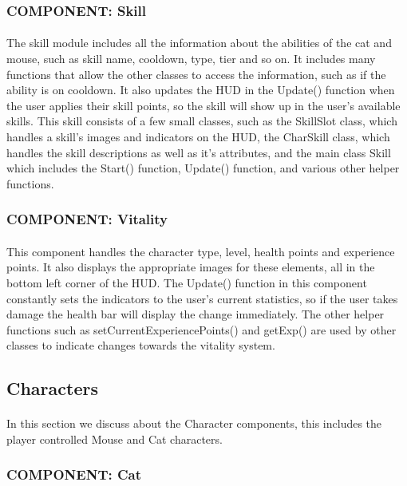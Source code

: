\documentclass[12pt, titlepage]{article}
\begin{document}
\subsubsection{COMPONENT: Skill}
\paragraph{}The skill module includes all the information about the abilities of the cat and mouse, such as skill name, cooldown, type, tier and so on. It includes many functions that allow the other classes to access the information, such as if the ability is on cooldown. It also updates the HUD in the Update() function when the user applies their skill points, so the skill will show up in the user's available skills.
This skill consists of a few small classes, such as the SkillSlot class, which handles a skill's images and indicators on the HUD, the CharSkill class, which handles the skill descriptions as well as it's attributes, and the main class Skill which includes the Start() function, Update() function, and various other helper functions.
\subsubsection{COMPONENT: Vitality}
\paragraph{}This component handles the character type, level, health points and experience points. It also displays the appropriate images for these elements, all in the bottom left corner of the HUD. The Update() function in this component constantly sets the indicators to the user's current statistics, so if the user takes damage the health bar will display the change immediately. The other helper functions such as setCurrentExperiencePoints() and getExp() are used by other classes to indicate changes towards the vitality system.
\subsection{Characters}
\paragraph{} In this section we discuss about the Character components, this includes the player controlled Mouse and Cat characters.
\subsubsection{COMPONENT: Cat}
\end{document}
